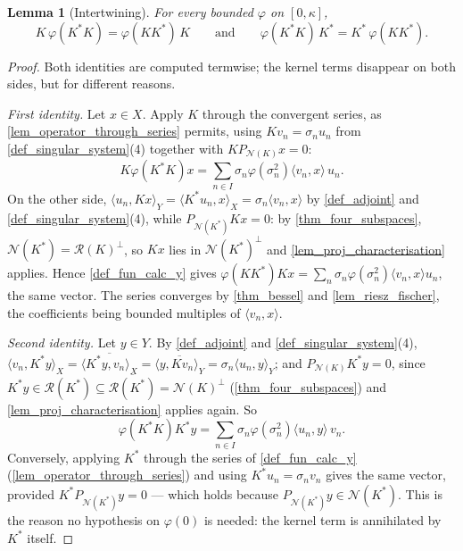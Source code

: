 \documentclass[a4paper]{report}
\theoremstyle{plain}
\newtheorem{lemma}[theorem]{Lemma}
\theoremstyle{definition}
\theoremstyle{remark}
\begin{document}
\begin{lemma}[Intertwining]
  \label{lem_fun_calc_intertwine}
  For every bounded $\varphi$ on $[0,\kappa]$,
  \[
    K\,\varphi(K^*K) = \varphi(KK^*)\,K
    \qquad\text{and}\qquad
    \varphi(K^*K)\,K^* = K^*\,\varphi(KK^*) .
  \]
\end{lemma}
\begin{proof}
  Both identities are computed termwise; the kernel terms disappear on both sides, but for
  different reasons.

  \emph{First identity.}  Let $x \in X$.  Apply $K$ through the convergent series, as
  \cref{lem_operator_through_series} permits, using $Kv_n = \sigma_nu_n$ from
  \cref{def_singular_system}(4) together with $KP_{\mathcal{N}(K)}x = 0$:
  \[
    K\varphi(K^*K)x
      = \sum_{n \in I}\sigma_n\varphi(\sigma_n^2)\langle v_n,x\rangle\,u_n .
  \]
  On the other side, $\langle u_n, Kx\rangle_Y = \langle K^*u_n, x\rangle_X
  = \sigma_n\langle v_n,x\rangle$ by \cref{def_adjoint} and
  \cref{def_singular_system}(4), while $P_{\mathcal{N}(K^*)}Kx = 0$: by
  \cref{thm_four_subspaces}, $\mathcal{N}(K^*) = \mathcal{R}(K)^\perp$, so $Kx$ lies in
  $\mathcal{N}(K^*)^\perp$ and \cref{lem_proj_characterisation} applies.  Hence
  \cref{def_fun_calc_y} gives
  $\varphi(KK^*)Kx = \sum_{n}\sigma_n\varphi(\sigma_n^2)\langle v_n,x\rangle u_n$, the same
  vector.  The series converges by \cref{thm_bessel} and \cref{lem_riesz_fischer}, the
  coefficients being bounded multiples of $\langle v_n,x\rangle$.

  \emph{Second identity.}  Let $y \in Y$.  By \cref{def_adjoint} and
  \cref{def_singular_system}(4),
  $\langle v_n, K^*y\rangle_X = \overline{\langle K^*y,v_n\rangle_X}
   = \overline{\langle y, Kv_n\rangle_Y} = \sigma_n\langle u_n,y\rangle_Y$; and
  $P_{\mathcal{N}(K)}K^*y = 0$, since
  $K^*y \in \mathcal{R}(K^*) \subseteq \overline{\mathcal{R}(K^*)} =
  \mathcal{N}(K)^\perp$ (\cref{thm_four_subspaces}) and
  \cref{lem_proj_characterisation} applies again.  So
  \[
    \varphi(K^*K)K^*y
      = \sum_{n\in I}\sigma_n\varphi(\sigma_n^2)\langle u_n,y\rangle\,v_n .
  \]
  Conversely, applying $K^*$ through the series of \cref{def_fun_calc_y}
  (\cref{lem_operator_through_series}) and using $K^*u_n = \sigma_nv_n$ gives the same
  vector, provided $K^*P_{\mathcal{N}(K^*)}y = 0$ --- which holds because
  $P_{\mathcal{N}(K^*)}y \in \mathcal{N}(K^*)$.  This is the reason no hypothesis on
  $\varphi(0)$ is needed: the kernel term is annihilated by $K^*$ itself.
\end{proof}
\end{document}
